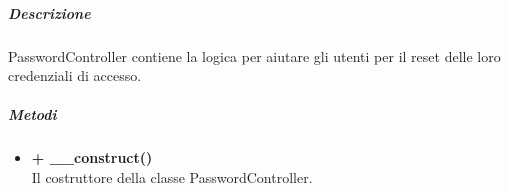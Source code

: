 		\subparagraph{Descrizione}
			PasswordController contiene la logica per aiutare gli utenti per il reset delle loro credenziali di accesso.
		\subparagraph{Metodi}
			\begin{itemize}
				\item \textbf{+ \_\_construct()}\\
				Il costruttore della classe PasswordController.
			\end{itemize}
	